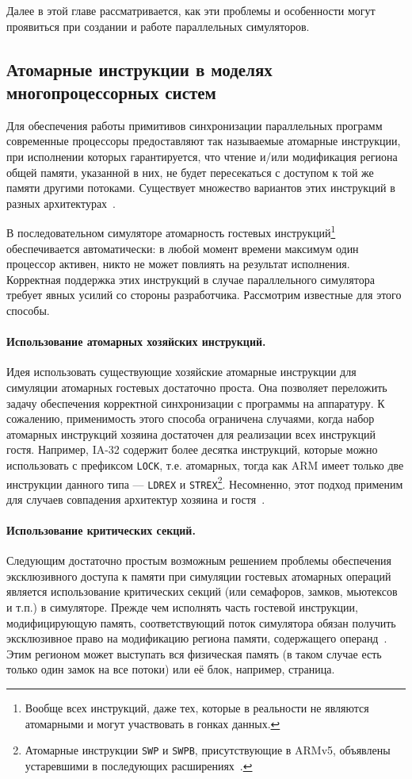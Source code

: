 Далее в этой главе рассматривается, как эти проблемы и особенности могут проявиться при создании и работе параллельных симуляторов.

\subsection[Атомарные инструкции]{Атомарные инструкции в моделях многопроцессорных систем}\label{sec:atomics}

Для обеспечения работы примитивов синхронизации параллельных программ современные процессоры предоставляют так называемые атомарные инструкции, при исполнении которых гарантируется, что чтение и/или модификация региона общей памяти, указанной в них, не будет пересекаться с доступом к той же памяти другими потоками. Существует множество вариантов этих инструкций в разных архитектурах~\cite{habr-atomics, habr-lock-free}. 

В последовательном симуляторе атомарность гостевых инструкций\footnote{Вообще всех инструкций, даже тех, которые в реальности не являются атомарными и могут участвовать в гонках данных.} обеспечивается автоматически: в любой момент времени максимум один процессор активен, никто не может повлиять на результат исполнения. Корректная поддержка этих инструкций в случае параллельного симулятора требует явных усилий со стороны разработчика. Рассмотрим известные для этого способы.

\paragraph{Использование атомарных хозяйских инструкций.} Идея использовать существующие хозяйские атомарные инструкции для симуляции атомарных гостевых достаточно проста. Она позволяет переложить задачу обеспечения корректной синхронизации с программы на аппаратуру. К сожалению, применимость этого способа ограничена случаями, когда набор атомарных инструкций хозяина достаточен для реализации всех инструкций гостя. Например, IA-32 содержит более десятка инструкций, которые можно использовать с префиксом \texttt{LOCK}, т.е. атомарных, тогда как ARM имеет только две инструкции данного типа — \texttt{LDREX} и \texttt{STREX}\footnote{Атомарные инструкции \texttt{SWP} и \texttt{SWPB}, присутствующие в ARMv5, объявлены устаревшими в последующих расширениях~\cite{arm-atomics}.}. Несомненно, этот подход применим для случаев совпадения архитектур хозяина и гостя~\cite{lantz-thesis}.

\paragraph{Использование критических секций.} Следующим достаточно простым возможным решением проблемы обеспечения эксклюзивного доступа к памяти при симуляции гостевых атомарных операций является использование критических секций (или семафоров, замков, мьютексов и т.п.) в симуляторе. Прежде чем исполнять часть гостевой инструкции, модифицирующую память, соответствующий поток симулятора обязан получить эксклюзивное право на модификацию региона памяти, содержащего операнд~\cite{pqemu2001}. Этим регионом может выступать вся физическая память (в таком случае есть только один замок на все потоки) или её блок, например, страница.

